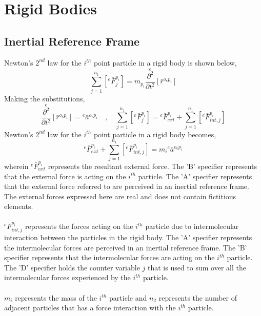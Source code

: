 \section{Rigid Bodies}
\begin{comment}
\end{comment}
\subsection{Inertial Reference Frame}
\begin{comment}
\end{comment}
Newton's $2^{nd}$ law for the $i^{th}$ point particle in a rigid body is shown below,
$$\sum^{n_{1}}_{j = 1}\left[{}^{e}\bar{F}^{p_{i}}_{j}\right] = m_{p_{i}}\overset{e}{\frac{\partial^{2}}{\partial t^{2}}}[\bar{r}^{o_{e}p_{i}}]$$
Making the substitutions,
\begin{equation}\overset{e}{\frac{\partial^{2}}{\partial t^{2}}}[\bar{r}^{o_{e}p_{i}}] = {}^{e}\bar{a}^{o_{e}p_{i}}\quad,\quad \sum^{n_{1}}_{j = 1}\left[{}^{e}\bar{F}^{p_{i}}_{j}\right] = {}^{e}\bar{F}^{p_{i}}_{ext} + \sum^{n_{1}}_{j = 1}\left[{}^{e}\bar{F}^{p_{i}}_{int,j}\right]\label{rigid-forces}\end{equation}
Newton's $2^{nd}$ law for the $i^{th}$ point particle in a rigid body becomes,
$${}^{e}\bar{F}^{p_{i}}_{ext} + \sum^{n_{1}}_{j = 1}\left[{}^{e}\bar{F}^{p_{i}}_{int,j}\right] = m_{i}{}^{e}\bar{a}^{o_{e}p_{i}}$$
wherein ${}^{e}\bar{F}^{p_{i}}_{ext}$ represents the resultant external force. 
The 'B' specifier represents that the external force is acting on the $i^{th}$ particle. 
The 'A' specifier represents that the external force referred to are perceived in an inertial reference frame. 
The external forces expressed here are real and does not contain fictitious elements.
\\~\\${}^{e}\bar{F}^{p_{i}}_{int,j}$ represents the forces acting on the $i^{th}$ particle due to intermolecular interaction between the particles in the rigid body. 
The 'A' specifier represents the intermolecular forces are perceived in an inertial reference frame. 
The 'B' specifier represents that the intermolecular forces are acting on the $i^{th}$ particle. 
The 'D' specifier holds the counter variable $j$ that is used to sum over all the intermolecular forces experienced by the $i^{th}$ particle. 
\\~\\$m_{i}$ represents the mass of the $i^{th}$ particle and $n_{2}$ represents the number of adjacent particles that has a force interaction with the $i^{th}$ particle.
